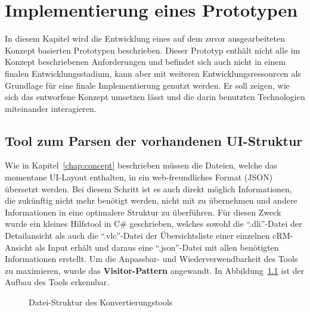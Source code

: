 \chapter{Implementierung eines Prototypen}\label{chap:implementation}
In diesem Kapitel wird die Entwicklung eines auf dem zuvor ausgearbeiteten Konzept basierten Prototypen beschrieben. Dieser Prototyp enthält nicht alle im Konzept beschriebenen Anforderungen und befindet sich auch nicht in einem finalen Entwicklungsstadium, kann aber mit weiteren Entwicklungsressourcen als Grundlage für eine finale Implementierung genutzt werden. Er soll zeigen, wie sich das entworfene Konzept umsetzen lässt und die darin benutzten Technologien miteinander interagieren. \\

\section{Tool zum Parsen der vorhandenen UI-Struktur}
Wie in Kapitel~\ref{chap:concept} beschrieben müssen die Dateien, welche das momentane UI-Layout enthalten, in ein web-freundliches Format (JSON) übersetzt werden. Bei diesem Schritt ist es auch direkt möglich Informationen, die zukünftig nicht mehr benötigt werden, nicht mit zu übernehmen und andere Informationen in eine optimalere Struktur zu überführen. Für diesen Zweck wurde ein kleines Hilfstool in C\# geschrieben, welches sowohl die \enquote{.dli}-Datei der Detailansicht als auch die \enquote{.vlc}-Datei der Übersichtsliste einer einzelnen cRM-Ansicht als Input erhält und daraus eine \enquote{.json}-Datei mit allen benötigten Informationen erstellt. Um die Anpassbar- und Wiederverwendbarkeit des Tools zu maximieren, wurde das \textbf{Visitor-Pattern} angewandt. In Abbildung~\ref{fig:web-conv_file-tree} ist der Aufbau des Tools erkennbar.

\begin{figure}
    \centering
    \captionsetup{justification=centering}
        \caption{Datei-Struktur des Konvertierungstools}\label{fig:web-conv_file-tree}
\end{figure}

